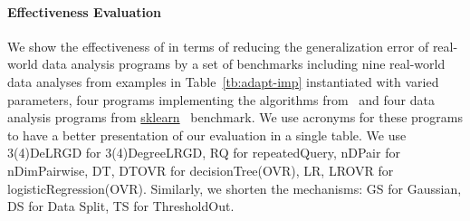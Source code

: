 \paragraph{Effectiveness Evaluation}

We show the effectiveness of {\THESYSTEM} in terms of reducing the generalization error of real-world data analysis programs
by a set of benchmarks including 
nine real-world data analyses from examples in Table~\ref{tb:adapt-imp} instantiated with varied parameters,
four programs implementing the algorithms from~\cite{Jamieson2015TheAO}
and four data analysis programs 
from \hyperlink{https://github.com/scikit-learn/scikit-learn/tree/main/examples}{sklearn}~\cite{SklearnBenchmark} benchmark.
{We use acronyms for these programs to have a better presentation of our evaluation in a single table. We use
 3(4)DeLRGD for 3(4)DegreeLRGD, RQ for repeatedQuery, nDPair for nDimPairwise,
DT, DTOVR for decisionTree(OVR), LR, LROVR for logisticRegression(OVR). Similarly, we shorten the mechanisms: GS for Gaussian, DS for Data Split,
TS for ThresholdOut.  }

